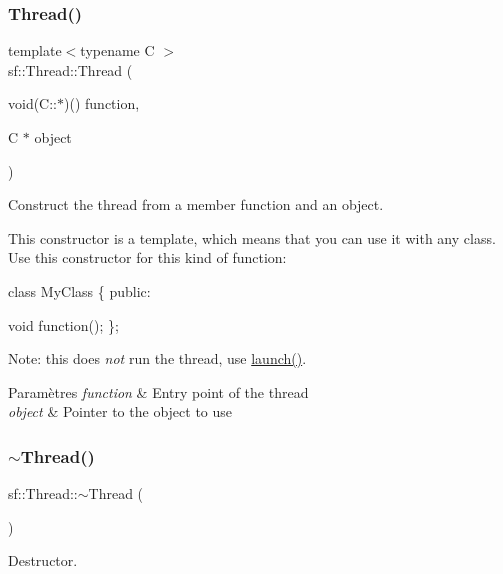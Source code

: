 \subsubsection{\texorpdfstring{Thread()}{Thread()}\hspace{0.1cm}{\footnotesize\ttfamily [3/3]}}
{\footnotesize\ttfamily template$<$typename C $>$ \\
sf\+::\+Thread\+::\+Thread (\begin{DoxyParamCaption}\item[{void(C\+::$\ast$)()}]{function,  }\item[{C $\ast$}]{object }\end{DoxyParamCaption})}



Construct the thread from a member function and an object. 

This constructor is a template, which means that you can use it with any class. Use this constructor for this kind of function\+: 
\begin{DoxyCode}
\textcolor{keyword}{class }MyClass
\{
\textcolor{keyword}{public}:

    \textcolor{keywordtype}{void} \textcolor{keyword}{function}();
\};
\end{DoxyCode}
 Note\+: this does {\itshape not} run the thread, use \hyperlink{classsf_1_1Thread_a74f75a9e86e1eb47479496314048b5f6}{launch()}.


\begin{DoxyParams}{Paramètres}
{\em function} & Entry point of the thread \\
\hline
{\em object} & Pointer to the object to use \\
\hline
\end{DoxyParams}
\mbox{\label{classsf_1_1Thread_af77942fc1730af7c31bc4c3a913a9c1d}} 
\subsubsection{\texorpdfstring{$\sim$\+Thread()}{~Thread()}}
{\footnotesize\ttfamily sf\+::\+Thread\+::$\sim$\+Thread (\begin{DoxyParamCaption}{ }\end{DoxyParamCaption})}



Destructor. 

